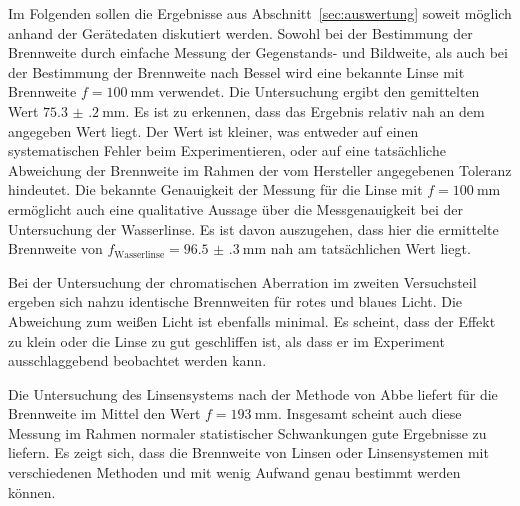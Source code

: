 \documentclass[
  parskip=half,
  bibliography=totoc,     %
  captions=tableheading,  %
  titlepage=firstiscover, %
]{scrartcl}
\begin{document}
Im Folgenden sollen die Ergebnisse aus Abschnitt~\ref{sec:auswertung} soweit möglich anhand der Gerätedaten
diskutiert werden. Sowohl bei der Bestimmung der Brennweite durch einfache Messung der Gegenstands- und
Bildweite, als auch bei der Bestimmung der Brennweite nach Bessel wird eine bekannte Linse mit
Brennweite $f=\SI{100}{\milli\metre}$ verwendet. Die Untersuchung ergibt den gemittelten Wert
$\SI{75.3(2)}{\milli\metre}$. Es ist zu erkennen, dass das
Ergebnis relativ nah an dem angegeben Wert liegt. Der Wert ist kleiner, was entweder auf einen
systematischen Fehler beim Experimentieren, oder auf eine tatsächliche Abweichung der Brennweite im Rahmen
der vom Hersteller angegebenen Toleranz hindeutet. Die bekannte Genauigkeit der Messung für die Linse mit
$f=\SI{100}{\milli\metre}$ ermöglicht auch eine qualitative Aussage über die Messgenauigkeit bei der
Untersuchung der Wasserlinse. Es ist davon auszugehen, dass hier die ermittelte Brennweite von $f_{\text{Wasserlinse}} = \SI{96.5(3)}{\milli\metre}$
 nah am tatsächlichen Wert liegt.

Bei der Untersuchung der chromatischen Aberration im zweiten Versuchsteil ergeben sich nahzu identische
Brennweiten für rotes und blaues Licht. Die Abweichung zum weißen Licht ist ebenfalls minimal. Es scheint,
dass der Effekt zu klein oder die Linse zu gut geschliffen ist, als dass er im Experiment ausschlaggebend beobachtet werden
kann.

Die Untersuchung des Linsensystems nach der Methode von Abbe liefert für die Brennweite im Mittel
den Wert $f=\SI{193}{\milli\metre}$. Insgesamt scheint auch diese Messung im
Rahmen normaler statistischer Schwankungen gute Ergebnisse zu liefern. Es zeigt sich, dass die Brennweite
von Linsen oder Linsensystemen mit verschiedenen Methoden und mit wenig Aufwand genau bestimmt werden können.
\clearpage
\nocite{*}
\printbibliography
\end{document}
